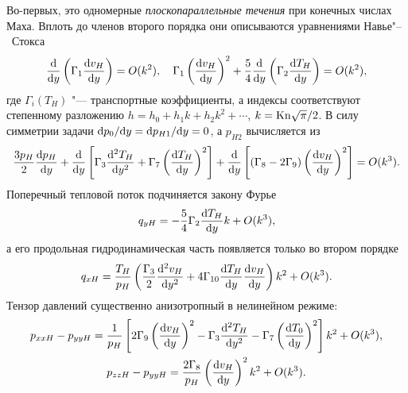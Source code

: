 Во-первых, это одномерные \emph{плоскопараллельные течения} при конечных числах Маха.
Вплоть до членов второго порядка они описываются уравнениями Навье"--~Стокса
\begin{equation*}
    \der{y}\left(\Gamma_1\der[v_H]{y}\right) = \OO{k^2}, \quad
    \Gamma_1\left(\der[v_H]{y}\right)^2
        + \frac54\der{y}\left(\Gamma_2\der[T_H]{y}\right) = \OO{k^2},
\end{equation*}
где \(\Gamma_i(T_H)\) "--- транспортные коэффициенты,
а индексы соответствуют степенному разложению \(h = h_0 + h_1k + h_2k^2 + \cdots\), \(k=\Kn\sqrt\pi/2\).
В силу симметрии задачи \(\Der[p_0]{y}=\Der[p_{H1}]{y}=0\), а \(p_{H2}\) вычисляется из
\begin{equation*}
    \frac{3p_H}{2}\der[p_H]{y}
        + \der{y}\left[ \Gamma_3 \derdual[T_H]{y} + \Gamma_7\left(\der[T_H]{y}\right)^2 \right]
        + \der{y}\left[ (\Gamma_8-2\Gamma_9)\left(\der[v_H]{y}\right)^2 \right] = \OO{k^3}.
\end{equation*}
Поперечный тепловой поток подчиняется закону Фурье
\begin{equation*}
    q_{yH} = -\frac54\Gamma_2\der[T_H]{y}k + \OO{k^3},
\end{equation*}
а его продольная гидродинамическая часть появляется только во втором порядке
\begin{equation*}
    q_{xH} = \frac{T_H}{p_H}\left( \frac{\Gamma_3}2 \derdual[v_H]{y}
        + 4\Gamma_{10} \der[T_H]{y}\der[v_H]{y} \right)k^2 + \OO{k^3}.
\end{equation*}
Тензор давлений существенно анизотропный в нелинейном режиме:
\begin{gather*}
    p_{xxH} - p_{yyH} = \frac1{p_H}\left[
        2\Gamma_9 \left(\der[v_H]{y}\right)^2 - \Gamma_3\derdual[T_H]{y} - \Gamma_7\left(\der[T_0]{y}\right)^2
    \right]k^2 + \OO{k^3}, \\
    p_{zzH} - p_{yyH} = \frac{2\Gamma_8}{p_H}\left(\der[v_H]{y}\right)^2 k^2 + \OO{k^3}.
\end{gather*}

